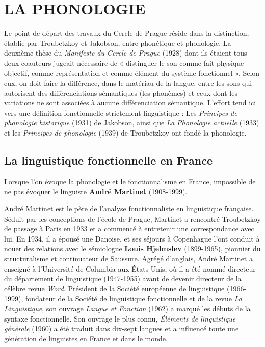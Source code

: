 \section{LA PHONOLOGIE}
Le point de départ des travaux du Cercle de Prague réside dans la distinction, établie par Troubetzkoy et Jakobson, entre phonétique et phonologie. La deuxième thèse du \textit{Manifeste du Cercle de Prague} (1928) dont ils étaient tous deux coauteurs jugeait nécessaire de « distinguer le son comme fait physique objectif, comme représentation et comme élément du système fonctionnel ». Selon eux, on doit faire la différence, dans le matériau de la langue, entre les sons qui autorisent des différenciations sémantiques (les phonèmes) et ceux dont les variations ne sont associées à aucune différenciation sémantique. L’effort tend ici vers une définition fonctionnelle strictement linguistique : Les \textit{Principes de phonologie historique} (1931) de Jakobson, ainsi que \textit{La Phonologie actuelle} (1933) et les \textit{Principes de phonologie} (1939) de Troubetzkoy ont fondé la phonologie.

\subsection{La linguistique fonctionnelle en France}
Lorsque l’on évoque la phonologie et le fonctionnalisme en France, impossible de ne pas évoquer le linguiste \textbf{André Martinet} (1908-1999).

André Martinet est le père de l’analyse fonctionnaliste en linguistique française. Séduit par les conceptions de l’école de Prague, Martinet a rencontré Troubetzkoy de passage à Paris en 1933 et a commencé à entretenir une correspondance avec lui. En 1934, il a épousé une Danoise, et ses séjours à Copenhague l’ont conduit à nouer des relations avec le sémiologue \textbf{Louis Hjelmslev} (1899-1965), pionnier du structuralisme et continuateur de Saussure. Agrégé d’anglais, André Martinet a enseigné à l’Université de Columbia aux États-Unis, où il a été nommé directeur du département de linguistique (1947-1955) avant de devenir directeur de la célèbre revue \textit{Word}. Président de la Société européenne de linguistique (1966-1999), fondateur de la Société de linguistique fonctionnelle et de la revue \textit{La Linguistique}, son ouvrage \textit{Langue et Fonction} (1962) a marqué les débuts de la syntaxe fonctionnelle. Son ouvrage le plus connu, \textit{Éléments de linguistique générale} (1960) a été traduit dans dix-sept langues et a influencé toute une génération de linguistes en France et dans le monde.

